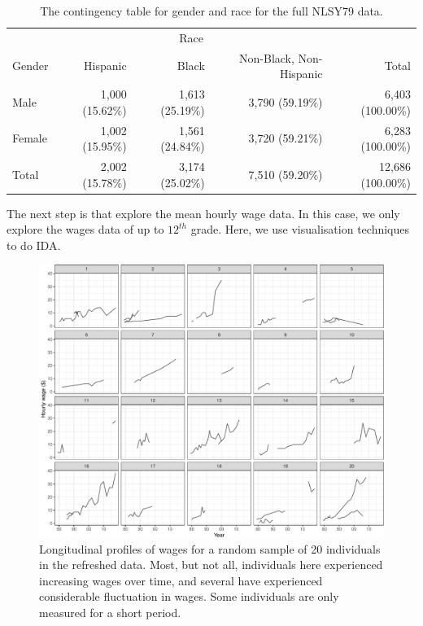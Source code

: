 \documentclass{article}
\begin{document}
\begin{table}

\caption{\label{tab:gender-race-table}The contingency table for gender and race for the full NLSY79 data.}
\centering
\begin{tabular}[t]{lrrrr}
\toprule
\multicolumn{1}{c}{ } & \multicolumn{3}{c}{Race} & \multicolumn{1}{c}{ } \\
\cmidrule(l{3pt}r{3pt}){2-4}
Gender & Hispanic & Black & Non-Black, Non-Hispanic & Total\\
\midrule
Male & 1,000 (15.62\%) & 1,613 (25.19\%) & 3,790 (59.19\%) & 6,403 (100.00\%)\\
Female & 1,002 (15.95\%) & 1,561 (24.84\%) & 3,720 (59.21\%) & 6,283 (100.00\%)\\
\midrule
Total & 2,002 (15.78\%) & 3,174 (25.02\%) & 7,510 (59.20\%) & 12,686 (100.00\%)\\
\bottomrule
\end{tabular}
\end{table}

The next step is that explore the mean hourly wage data. In this case, we only explore the wages data of up to \(12^{th}\) grade. Here, we use visualisation techniques to do IDA.

\begin{figure}

{\centering \includegraphics[width=1\linewidth]{figures/sample-plot-1} 

}

\caption{Longitudinal profiles of wages for a random sample of 20 individuals in the refreshed data. Most, but not all, individuals here experienced increasing wages over time, and several have experienced considerable fluctuation in wages. Some individuals are only measured for a short period.}\label{fig:sample-plot}
\end{figure}
\end{document}
